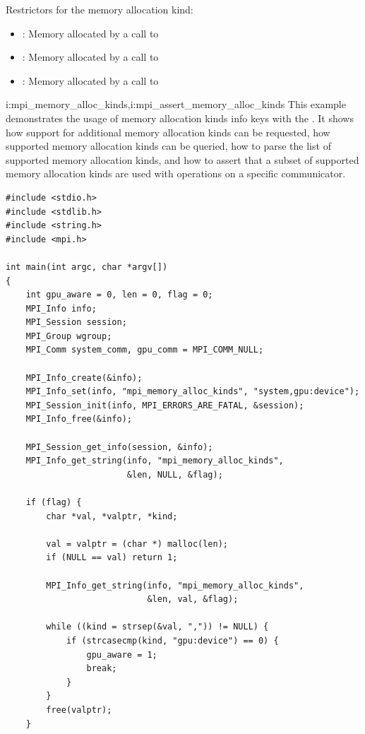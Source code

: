 Restrictors for the  memory allocation kind:
\begin{itemize}
    \item {}: Memory allocated by a call to 
    \item {}: Memory allocated by a call to 
    \item {}: Memory allocated by a call to 
\end{itemize}

\begin{example}
\label{example:alloc-kinds-spm}
{i:mpi\_memory\_alloc\_kinds,i:mpi\_assert\_memory\_alloc\_kinds}%
This example demonstrates the usage of memory allocation kinds info keys with the \spm.
It shows how support for additional memory allocation kinds can be requested,
how supported memory allocation kinds can be queried,
how to parse the list of supported memory allocation kinds,
and how to assert that a subset of supported memory allocation kinds are used
with operations on a specific communicator.
\begin{lstlisting}[language={[MPI]C}]
#include <stdio.h>
#include <stdlib.h>
#include <string.h>
#include <mpi.h>

int main(int argc, char *argv[])
{
    int gpu_aware = 0, len = 0, flag = 0;
    MPI_Info info;
    MPI_Session session;
    MPI_Group wgroup;
    MPI_Comm system_comm, gpu_comm = MPI_COMM_NULL;

    MPI_Info_create(&info);
    MPI_Info_set(info, "mpi_memory_alloc_kinds", "system,gpu:device");
    MPI_Session_init(info, MPI_ERRORS_ARE_FATAL, &session);
    MPI_Info_free(&info);

    MPI_Session_get_info(session, &info);
    MPI_Info_get_string(info, "mpi_memory_alloc_kinds",
                        &len, NULL, &flag);

    if (flag) {
        char *val, *valptr, *kind;

        val = valptr = (char *) malloc(len);
        if (NULL == val) return 1;

        MPI_Info_get_string(info, "mpi_memory_alloc_kinds",
                            &len, val, &flag);

        while ((kind = strsep(&val, ",")) != NULL) {
            if (strcasecmp(kind, "gpu:device") == 0) {
                gpu_aware = 1;
                break;
            }
        }
        free(valptr);
    }


\end{lstlisting}
\end{example}
